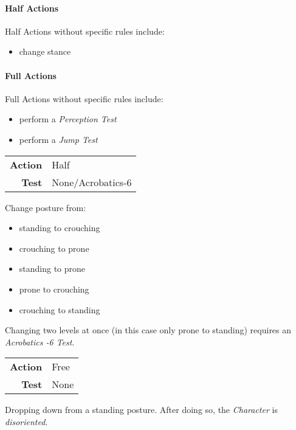\paragraph{Half Actions}
Half Actions without specific rules include:
\begin{itemize}[parsep=0em]
    \item change stance
\end{itemize}

\paragraph{Full Actions}
Full Actions without specific rules include:
\begin{itemize}[parsep=0em]
    \item perform a \emph{Perception Test}
    \item perform a \emph{Jump Test}
\end{itemize}


\begin{tabular}{rl}
    \textbf{Action} & Half              \\
    \textbf{Test}   & None/Acrobatics-6 \\
\end{tabular}

\hfill

Change posture from:
\begin{itemize}[parsep=0em]
    \item standing to crouching
    \item crouching to prone
    \item standing to prone
    \item prone to crouching
    \item crouching to standing
\end{itemize}

Changing two levels at once (in this case only prone to standing)
requires an \emph{Acrobatics -6 Test}.

\begin{tabular}{rl}
    \textbf{Action} & Free \\
    \textbf{Test}   & None \\
\end{tabular}

\hfill

Dropping down from a standing posture. After doing so, the \emph{Character} is
\emph{disoriented}.

